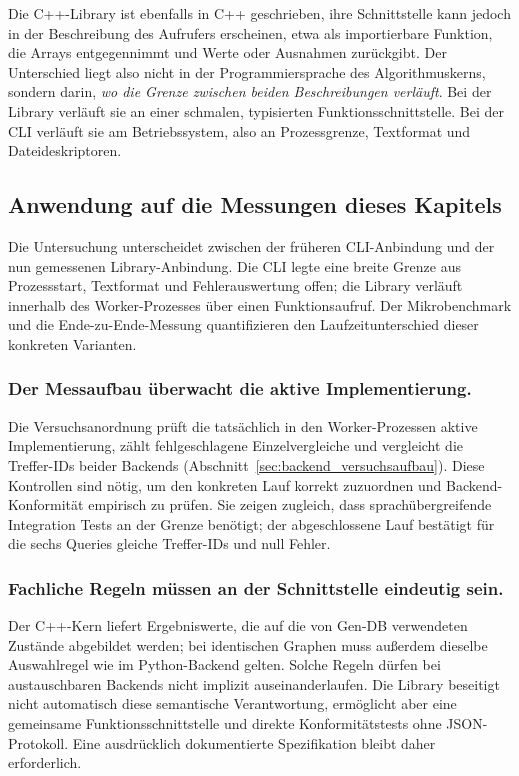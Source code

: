 \documentclass[a4paper,12pt, twoside]{report}
\theoremstyle{definition}
\begin{document}
Die C++-Library ist ebenfalls in C++ geschrieben, ihre Schnittstelle kann jedoch in der Beschreibung des Aufrufers erscheinen, etwa als importierbare Funktion, die Arrays entgegennimmt und Werte oder Ausnahmen zurückgibt. Der Unterschied liegt also nicht in der Programmiersprache des Algorithmuskerns, sondern darin, \emph{wo die Grenze zwischen beiden Beschreibungen verläuft}. Bei der Library verläuft sie an einer schmalen, typisierten Funktionsschnittstelle. Bei der CLI verläuft sie am Betriebssystem, also an Prozessgrenze, Textformat und Dateideskriptoren.

\subsection{Anwendung auf die Messungen dieses Kapitels}
\label{sec:fremde_messung}

Die Untersuchung unterscheidet zwischen der früheren CLI-Anbindung und der nun gemessenen Library-Anbindung. Die CLI legte eine breite Grenze aus Prozessstart, Textformat und Fehlerauswertung offen; die Library verläuft innerhalb des Worker-Prozesses über einen Funktionsaufruf. Der Mikrobenchmark und die Ende-zu-Ende-Messung quantifizieren den Laufzeitunterschied dieser konkreten Varianten.

\subsubsection{Der Messaufbau überwacht die aktive Implementierung.} Die Versuchsanordnung prüft die tatsächlich in den Worker-Prozessen aktive Implementierung, zählt fehlgeschlagene Einzelvergleiche und vergleicht die Treffer-IDs beider Backends (Abschnitt~\ref{sec:backend_versuchsaufbau}). Diese Kontrollen sind nötig, um den konkreten Lauf korrekt zuzuordnen und Backend-Konformität empirisch zu prüfen. Sie zeigen zugleich, dass sprachübergreifende Integration Tests an der Grenze benötigt; der abgeschlossene Lauf bestätigt für die sechs Queries gleiche Treffer-IDs und null Fehler.

\subsubsection{Fachliche Regeln müssen an der Schnittstelle eindeutig sein.} Der C++-Kern liefert Ergebniswerte, die auf die von Gen-DB verwendeten Zustände abgebildet werden; bei identischen Graphen muss außerdem dieselbe Auswahlregel wie im Python-Backend gelten. Solche Regeln dürfen bei austauschbaren Backends nicht implizit auseinanderlaufen. Die Library beseitigt nicht automatisch diese semantische Verantwortung, ermöglicht aber eine gemeinsame Funktionsschnittstelle und direkte Konformitätstests ohne JSON-Protokoll. Eine ausdrücklich dokumentierte Spezifikation bleibt daher erforderlich.
\end{document}
